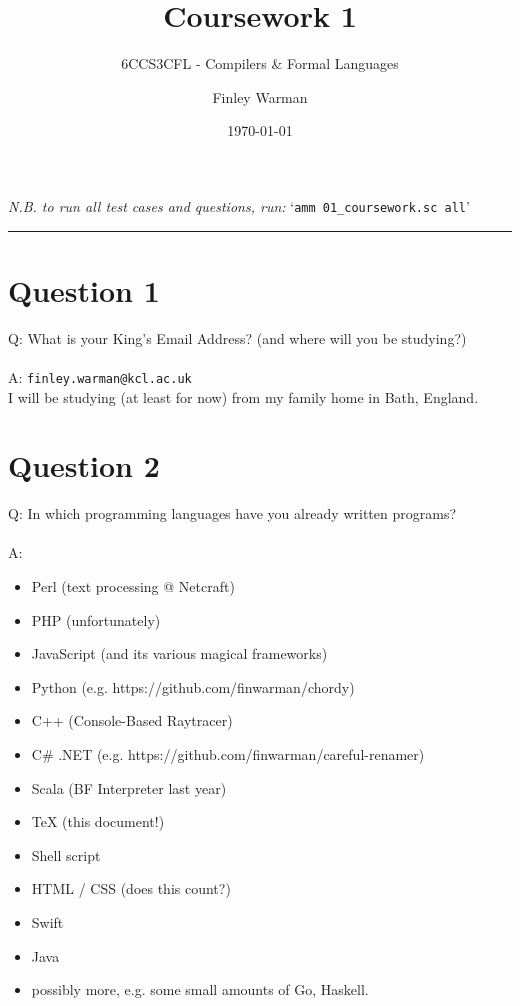 \documentclass[english]{scrartcl}
\begin{document}


\subtitle{6CCS3CFL - Compilers \& Formal Languages}
\title{Coursework 1}
\author{Finley Warman}
\date{\today}

\maketitle

\begin{center}
    \textit{N.B. to run all test cases and questions, run:} `\verb|amm 01_coursework.sc all|'
\end{center}


\tableofcontents
\par\noindent\rule{\textwidth}{0.4pt}



\newpage

\section*{Question 1}
Q: What is your King's Email Address? (and where will you be studying?)
\\
\\
A: \verb~finley.warman@kcl.ac.uk~ \\
I will be studying (at least for now) from my family home in Bath, England.

\section*{Question 2}
Q: In which programming languages have you already written programs?
\\
\\
A:
\begin{itemize}
    \item Perl (text processing @ Netcraft)
    \item PHP (unfortunately)
    \item JavaScript (and its various magical frameworks)
    \item Python (e.g. https://github.com/finwarman/chordy)
    \item C++ (Console-Based Raytracer)
    \item C\# .NET (e.g. https://github.com/finwarman/careful-renamer)
    \item Scala (BF Interpreter last year)
    \item TeX (this document!)
    \item Shell script
    \item HTML / CSS (does this count?)
    \item Swift
    \item Java
    \item possibly more, e.g. some small amounts of Go, Haskell.
\end{itemize}
\end{document}

